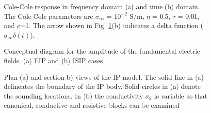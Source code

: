 \documentclass[extra,mreferee]{gji}
\newcommand{\siginf}{\sigma_\infty}
\begin{document}
\clearpage

\begin{figure}
  \caption{Cole-Cole response in frequency domain (a) and time (b) domain. The Cole-Cole parameters are $\siginf$ = $10^{-2}$ S/m, $\eta $ = 0.5, $\tau$ = 0.01, and $c$=1. The arrow shown in Fig. \ref{Fig:FDandTDCole}(b) indicates a delta function ($\siginf \delta(t)$). }
  \label{Fig:FDandTDCole}
\end{figure}

\begin{figure}
  \caption{Conceptual diagram for the amplitude of the fundamental electric fields. (a) EIP and (b) ISIP cases.}
  \label{F:DCEM_F_current}
\end{figure}

\begin{figure}
  \caption{Plan (a) and section b) views of the IP model. The solid line in (a) delineates the boundary of the IP body. Solid circles in (a) denote the sounding locations. In (b) the conductivity $\sigma_2$ is variable so that  canonical, conductive and resistive blocks can be examined}
  \label{F: IPModel}
\end{figure}
\end{document}
